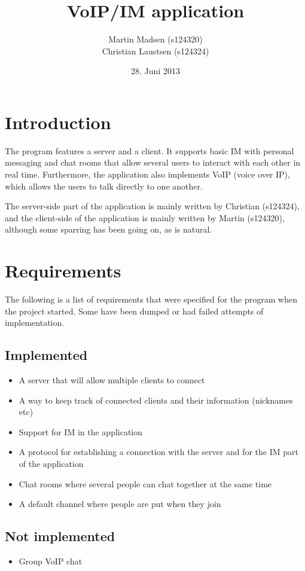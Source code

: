 \documentclass[12pt]{rapport}
\title{VoIP/IM application}
\author{
  Martin Madsen (s124320)\\
  Christian Laustsen (s124324)
}
\date{28. Juni 2013}
\begin{document}
\maketitle

\section*{Introduction}
The program features a server and a client. It supports basic IM with personal messaging and chat rooms that allow several users to interact with each other in real time. Furthermore, the application also implements VoIP (voice over IP), which allows the users to talk directly to one another.\newline


The server-side part of the application is mainly written by Christian (s124324), and the client-side of the application is mainly written by Martin (s124320), although some sparring has been going on, as is natural.


\section*{Requirements}
The following is a list of requirements that were specified for the program when the project started. Some have been dumped or had failed attempts of implementation.

\subsection*{Implemented}
\begin{itemize}
  \item A server that will allow multiple clients to connect
  \item A way to keep track of connected clients and their information (nicknames etc)
  \item Support for IM in the application
  \item A protocol for establishing a connection with the server and for the IM part of the application
  \item Chat rooms where several people can chat together at the same time
  \item A default channel where people are put when they join 
\end{itemize}

\subsection*{Not implemented}
\begin{itemize}
  \item Group VoIP chat
\end{itemize}
\end{document}
